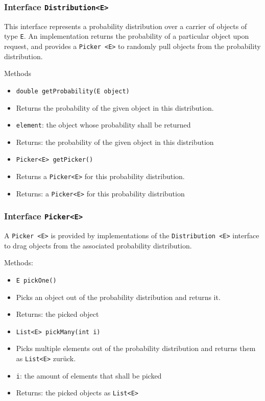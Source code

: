 \documentclass[parskip=full,11pt]{scrartcl}
\begin{document}

\subsubsection{Interface \texttt{Distribution<E>}}
This interface represents a probability distribution over a carrier of objects of type \texttt{E}. An implementation returns the probability of a particular object upon request, and provides a \texttt{Picker <E>} to randomly pull objects from the probability distribution.

Methods
\begin{itemize}\itemsep -10pt
\item \texttt{double getProbability(E object)}
\item[] Returns the probability of the given object in this distribution.
\item[] \texttt{element}: the object whose probability shall be returned
\item[] Returns: the probability of the given object in this distribution

\item \texttt{Picker<E> getPicker()}
\item[] Returns a \texttt{Picker<E>} for this probability distribution.
\item[] Returns: a \texttt{Picker<E>} for this probability distribution
\end{itemize}

\subsubsection{Interface \texttt{Picker<E>}}
A \texttt{Picker <E>} is provided by implementations of the \texttt{Distribution <E>} interface to drag objects from the associated probability distribution.

Methods:
\begin{itemize}\itemsep -10pt
\item \texttt{E pickOne()}
\item[] Picks an object out of the probability distribution and returns it.
\item[] Returns: the picked object

\item \texttt{List<E> pickMany(int i)}
\item[] Picks multiple elements out of the probability distribution and returns them as \texttt{List<E>} zurück.
\item[] \texttt{i}: the amount of elements that shall be picked
\item[] Returns: the picked objects as \texttt{List<E>}
\end{itemize}
\end{document}
